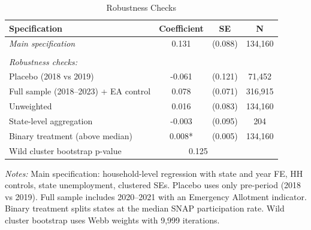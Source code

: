\begin{table}[H]
\centering
\caption{Robustness Checks}
\label{tab:robustness}
\begin{threeparttable}
\begin{tabular}{lccc}
\toprule
Specification & Coefficient & SE & N \\
\midrule
\textit{Main specification} & 0.131 & (0.088) & 134,160 \\
\\
\textit{Robustness checks:} & & & \\
\quad Placebo (2018 vs 2019) & -0.061 & (0.121) & 71,452 \\
\quad Full sample (2018--2023) + EA control & 0.078 & (0.071) & 316,915 \\
\quad Unweighted & 0.016 & (0.083) & 134,160 \\
\quad State-level aggregation & -0.003 & (0.095) & 204 \\
\quad Binary treatment (above median) & 0.008* & (0.005) & 134,160 \\
\quad Wild cluster bootstrap p-value & \multicolumn{2}{c}{0.125} & \\
\bottomrule
\end{tabular}
\begin{tablenotes}[flushleft]
\small
\item \textit{Notes:} Main specification: household-level regression with state and year FE, HH controls, state unemployment, clustered SEs. Placebo uses only pre-period (2018 vs 2019). Full sample includes 2020--2021 with an Emergency Allotment indicator. Binary treatment splits states at the median SNAP participation rate. Wild cluster bootstrap uses Webb weights with 9,999 iterations.
\end{tablenotes}
\end{threeparttable}
\end{table}
